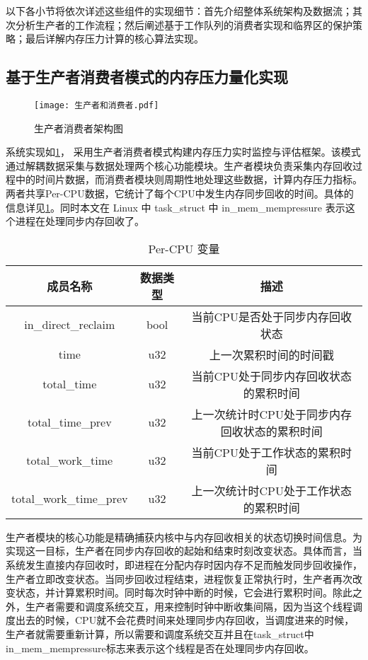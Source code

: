 以下各小节将依次详述这些组件的实现细节：首先介绍整体系统架构及数据流；其次分析生产者的工作流程；然后阐述基于工作队列的消费者实现和临界区的保护策略；最后详解内存压力计算的核心算法实现。

\subsection{基于生产者消费者模式的内存压力量化实现}

\begin{figure}[H]
    \centering
    \texttt{[image: 生产者和消费者.pdf]}
    \caption{生产者消费者架构图}
    \label{fig:producer-consumer}
\end{figure}

系统实现如\ref{fig:producer-consumer}， 采用生产者消费者模式构建内存压力实时监控与评估框架。该模式通过解耦数据采集与数据处理两个核心功能模块。生产者模块负责采集内存回收过程中的时间片数据，而消费者模块则周期性地处理这些数据，计算内存压力指标。两者共享Per-CPU数据，它统计了每个CPU中发生内存同步回收的时间。具体的信息详见\ref{tab:sensor_data}。同时本文在 Linux 中 task\_struct 中 in\_mem\_mempressure 表示这个进程在处理同步内存回收了。

\begin{table}[htbp]
    \centering
    \caption{Per-CPU 变量}
    \label{tab:sensor_data}
    \begin{tabular}{ccc}
        \toprule
        成员名称& 数据类型     & 描述                                        \\ \midrule
        in\_direct\_reclaim & bool & 当前CPU是否处于同步内存回收状态\\
        \midrule
        time & u32 & 上一次累积时间的时间戳\\
        \midrule
        total\_time &u32&当前CPU处于同步内存回收状态的累积时间\\
        \midrule
        total\_time\_prev&u32&上一次统计时CPU处于同步内存回收状态的累积时间\\
        \midrule
        total\_work\_time&u32&当前CPU处于工作状态的累积时间\\
        \midrule
        total\_work\_time\_prev&u32&上一次统计时CPU处于工作状态的累积时间\\
        \bottomrule
    \end{tabular}
  \end{table}

生产者模块的核心功能是精确捕获内核中与内存回收相关的状态切换时间信息。为实现这一目标，生产者在同步内存回收的起始和结束时刻改变状态。具体而言，当系统发生直接内存回收时，即进程在分配内存时因内存不足而触发同步回收操作，生产者立即改变状态。当同步回收过程结束，进程恢复正常执行时，生产者再次改变状态，并计算累积时间。同时每次时钟中断的时候，它会进行累积时间。除此之外，生产者需要和调度系统交互，用来控制时钟中断收集间隔，因为当这个线程调度出去的时候，CPU就不会花费时间来处理同步内存回收，当调度进来的时候，生产者就需要重新计算，所以需要和调度系统交互并且在task\_struct中in\_mem\_mempressure标志来表示这个线程是否在处理同步内存回收。

